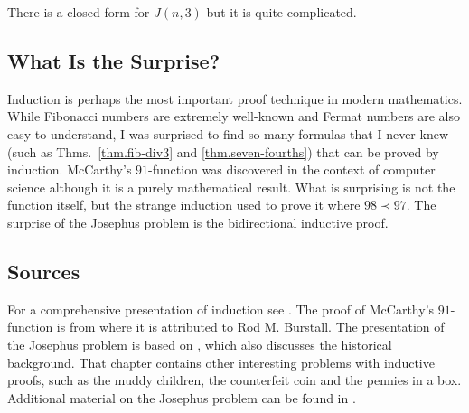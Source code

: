 There is a closed form for $J(n,3)$ but it is quite complicated.


\subsection*{What Is the Surprise?}

Induction is perhaps the most important proof technique in modern mathematics. While Fibonacci numbers are extremely well-known and Fermat numbers are also easy to understand, I was surprised to find so many formulas that I never knew (such as Thms.~\ref{thm.fib-div3} and \ref{thm.seven-fourths}) that can be proved by induction. McCarthy's $91$-function was discovered in the context of computer science although it is a purely mathematical result. What is surprising is not the function itself, but the strange induction used to prove it where $98\prec 97$. The surprise of the Josephus problem is the bidirectional inductive proof.

\subsection*{Sources}

For a comprehensive presentation of induction see \cite{gunderson}. The proof of McCarthy's $91$-function is from \cite{manna} where it is attributed to Rod M. Burstall. The presentation of the Josephus problem is based on \cite[Chapter~17]{gunderson}, which also discusses the historical background. That chapter contains other interesting problems with inductive proofs, such as the muddy children, the counterfeit coin and the pennies in a box. Additional material on the Josephus problem can be found in \cite{schumer,wiki:josephus}.
